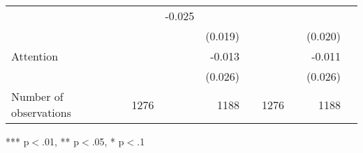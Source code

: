 \documentclass{article}
\begin{document}
\begin{table}[!h]
\begin{tabular}{lllllllll}
  \multicolumn{1}{r}{} &
  \multicolumn{1}{l}{} &
  \multicolumn{1}{r}{-0.025} &
  \multicolumn{1}{l}{} \\
\multicolumn{1}{l}{} &
  \multicolumn{1}{r}{} &
  \multicolumn{1}{l}{} &
  \multicolumn{1}{r}{(0.019)} &
  \multicolumn{1}{l}{} &
  \multicolumn{1}{r}{} &
  \multicolumn{1}{l}{} &
  \multicolumn{1}{r}{(0.020)} &
  \multicolumn{1}{l}{} \\
\multicolumn{1}{l}{Attention} &
  \multicolumn{1}{r}{} &
  \multicolumn{1}{l}{} &
  \multicolumn{1}{r}{-0.013} &
  \multicolumn{1}{l}{} &
  \multicolumn{1}{r}{} &
  \multicolumn{1}{l}{} &
  \multicolumn{1}{r}{-0.011} &
  \multicolumn{1}{l}{} \\
\multicolumn{1}{l}{} &
  \multicolumn{1}{r}{} &
  \multicolumn{1}{l}{} &
  \multicolumn{1}{r}{(0.026)} &
  \multicolumn{1}{l}{} &
  \multicolumn{1}{r}{} &
  \multicolumn{1}{l}{} &
  \multicolumn{1}{r}{(0.026)} &
  \multicolumn{1}{l}{} \\
\multicolumn{1}{l}{Number of observations} &
  \multicolumn{1}{r}{1276} &
  \multicolumn{1}{l}{} &
  \multicolumn{1}{r}{1188} &
  \multicolumn{1}{l}{} &
  \multicolumn{1}{r}{1276} &
  \multicolumn{1}{l}{} &
  \multicolumn{1}{r}{1188} &
  \multicolumn{1}{l}{} \\
\cline{1-9}
\end{tabular}

\footnotesize{
*** p$<$.01, ** p$<$.05, * p$<$.1
}
\end{table}
\end{document}
